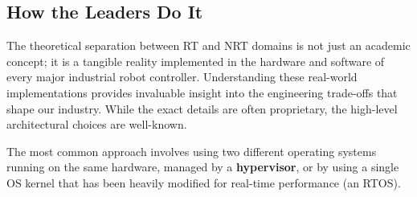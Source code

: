 \subsection{How the Leaders Do It}
\label{subsec:how_the_leaders_do_it}

The theoretical separation between RT and NRT domains is not just an academic concept; it is a tangible reality implemented in the hardware and software of every major industrial robot controller. Understanding these real-world implementations provides invaluable insight into the engineering trade-offs that shape our industry. While the exact details are often proprietary, the high-level architectural choices are well-known.

The most common approach involves using two different operating systems running on the same hardware, managed by a \textbf{hypervisor}, or by using a single OS kernel that has been heavily modified for real-time performance (an RTOS).

